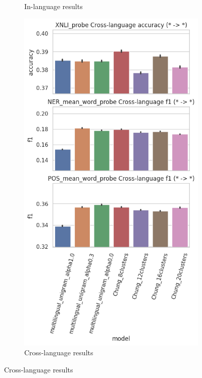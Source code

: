 \begin{figure}
\begin{subfigure}{.5\textwidth}
      \caption{In-language results}
      \label{fig:probe_overall_inlanguage}
    \end{subfigure}%
    \begin{subfigure}{.5\textwidth}
      \centering
      \includegraphics[width=\linewidth]{img/temp/probe_overall_crosslanguage.png}
      \caption{Cross-language results}
      \label{fig:probe_overall_crosslanguage}

\end{subfigure}
\end{figure}
